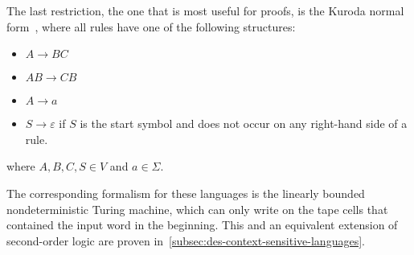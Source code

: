 The last restriction, the one that is most useful for proofs, is the Kuroda normal form~\cite{Pettorossi2022}, where all rules have one of the following structures:
\begin{itemize}
    \setlength\itemsep{0.2em}
    \item $A \to BC$
    \item $AB \to CB$
    \item $A \to a$
    \item $S \to \varepsilon$ if $S$ is the start symbol and does not occur on any right-hand side of a rule.
\end{itemize}
where $A, B, C, S \in V$ and $a \in \Sigma$.

The corresponding formalism for these languages is the linearly bounded nondeterministic Turing machine, which can only write on the tape cells that contained the input word in the beginning.
This and an equivalent extension of second-order logic are proven in~\cref{subsec:des-context-sensitive-languages}.

